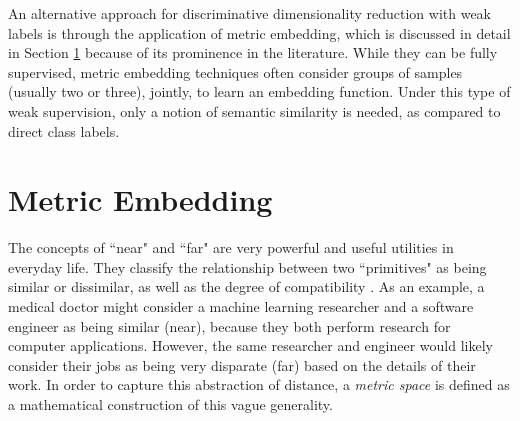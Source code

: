 An alternative approach for discriminative dimensionality reduction with weak labels is through the application of metric embedding, which is discussed in detail in Section \ref{sec:MetricEmedding} because of its prominence in the literature.  While they can be fully supervised, metric embedding techniques often consider groups of samples (usually two or three), jointly, to learn an embedding function.  Under this type of weak supervision, only a notion of semantic similarity is needed,  as compared to direct class labels. 

\section{Metric Embedding} \label{sec:MetricEmedding}

The concepts of ``near" and ``far" are very powerful and useful utilities in everyday life.  They classify the relationship between two ``primitives" as being similar or dissimilar, as well as the degree of compatibility \citep{Thorstensen2009ManifoldThesis}. As an example, a medical doctor might consider a machine learning researcher and a software engineer as being similar (near), because they both perform research for computer applications.  However, the same researcher and engineer would likely consider their jobs as being very disparate (far) based on the details of their work.  In order to capture this abstraction of distance, a \textit{metric space} is defined as a mathematical construction  of this vague generality.

